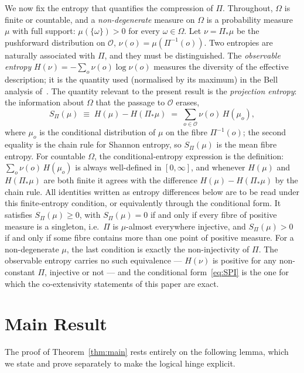 \documentclass[12pt,a4paper]{article}
\begin{document}
  We now fix the entropy that quantifies the compression of $\Pi$.
  Throughout, $\Omega$ is finite or countable, and a \emph{non-degenerate} measure on $\Omega$ is a probability
  measure $\mu$ with full support: $\mu(\{\omega\}) > 0$ for every $\omega \in \Omega$.
  Let $\nu = \Pi_*\mu$ be the pushforward distribution on $\mathcal{O}$, $\nu(o) = \mu(\Pi^{-1}(o))$.
  Two entropies are naturally associated with $\Pi$, and they must be distinguished.
  The \emph{observable entropy} $H(\nu) = -\sum_o \nu(o)\log\nu(o)$ measures the diversity of the effective
  description; it is the quantity used (normalised by its maximum) in the Bell analysis of~\citep{Beau2026b}.
  The quantity relevant to the present result is the \emph{projection entropy}: the information about $\Omega$
  that the passage to $\mathcal{O}$ erases,
  \begin{equation}
    S_\Pi(\mu) \;\equiv\; H(\mu) - H(\Pi_*\mu) \;=\; \sum_{o \in \mathcal{O}} \nu(o)\, H(\mu_o),
    \label{eq:SPI}
  \end{equation}
  where $\mu_o$ is the conditional distribution of $\mu$ on the fibre $\Pi^{-1}(o)$; the second equality is the
  chain rule for Shannon entropy, so $S_\Pi(\mu)$ is the mean fibre entropy.
  For countable $\Omega$, the conditional-entropy expression is the definition:
  $\sum_o \nu(o)\, H(\mu_o)$ is always well-defined in $[0, \infty]$, and whenever $H(\mu)$ and $H(\Pi_*\mu)$
  are both finite it agrees with the difference $H(\mu) - H(\Pi_*\mu)$ by the chain rule.
  All identities written as entropy differences below are to be read under this finite-entropy condition, or
  equivalently through the conditional form.
  It satisfies $S_\Pi(\mu) \geq 0$, with $S_\Pi(\mu) = 0$ if and only if every fibre of positive measure is a
  singleton, i.e.\ $\Pi$ is $\mu$-almost everywhere injective, and $S_\Pi(\mu) > 0$ if and only if some fibre
  contains more than one point of positive measure.
  For a non-degenerate $\mu$, the last condition is exactly the non-injectivity of $\Pi$.
  The observable entropy carries no such equivalence --- $H(\nu)$ is positive for any non-constant $\Pi$,
  injective or not --- and the conditional form~\eqref{eq:SPI} is the one for which the co-extensivity
  statements of this paper are exact.

  \section{Main Result}
  \label{sec:theorem}

  The proof of Theorem~\ref{thm:main} rests entirely on the following lemma,
  which we state and prove separately to make the logical hinge explicit.
\end{document}
